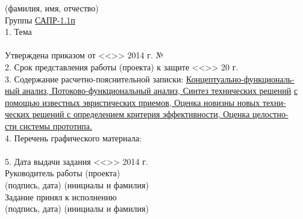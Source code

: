 \begin{titlepage}
    \vspace{-0.2cm}\hspace{5cm}\footnotesize(фамилия, имя, отчество)\normalsize\\
    Группы \underline{\hspace{1cm}САПР-1.1п\hspace{2cm}}\\
    1. Тема \underline{\hspace{15.3cm}}\\
    \underline{\hspace{\textwidth}}\\
    Утверждена приказом от <<\underline{\hspace{1cm}}>> \underline{\hspace{4cm}} 
        2014 г. № \underline{\hspace{3.8cm}}\\
    2. Срок представления работы (проекта) к защите 
        <<\underline{\hspace{1cm}}>> \underline{\hspace{2.8cm}} 20\underline{\hspace{0.5cm}} г.\\
    3. Содержание расчетно-пояснительной записки: \underline{Концептуально-функциональ-} 
    \underline{ный анализ, Потоково-функциональный анализ, Синтез технических решений} 
    \underline{с помощью известных эвристических приемов, Оценка новизны новых техни-} 
    \underline{ческих решений с определением критерия эффективности, Оценка целостно-}\\
    \underline{сти системы прототипа.}\\
    4. Перечень графического материала: \underline{\hspace{8.5cm}}\\
    \underline{\hspace{\textwidth}}\\
    5. Дата выдачи задания <<\underline{\hspace{1cm}}>> \underline{\hspace{4cm}} 2014 г.\\
    Руководитель работы (проекта) \underline{\hspace{5cm}}
        \hspace{0.5cm} \underline{\hspace{4.2cm}}\\[-.3cm]
        \vspace{-0.2cm}\hspace{8cm}\footnotesize(подпись, дата)
        \hspace{3cm}(инициалы и фамилия)\normalsize\\
    Задание принял к исполнению \hspace{0.2cm}\underline{\hspace{5cm}}
        \hspace{0.5cm} \underline{\hspace{4.2cm}}\\[-.3cm]
        \vspace{-0.2cm}\hspace{8cm}\footnotesize(подпись, дата)
        \hspace{3cm}(инициалы и фамилия)\normalsize\\
\end{titlepage}
\setcounter{page}{3}